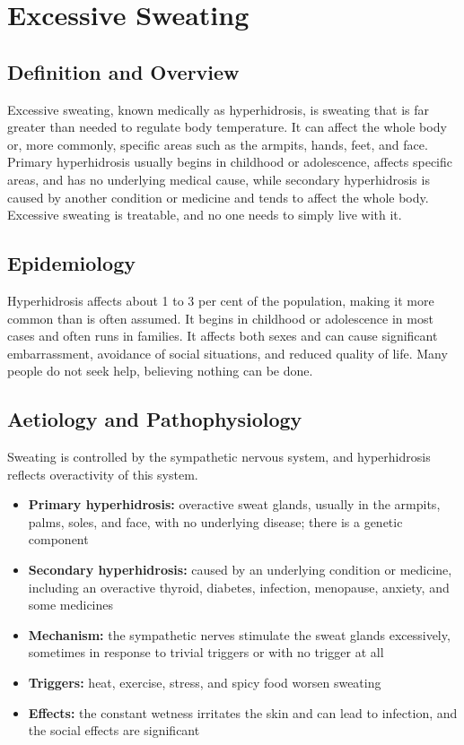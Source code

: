 \chapter{Excessive Sweating}

\section*{Definition and Overview}
Excessive sweating, known medically as hyperhidrosis, is sweating that is far greater than needed to regulate body temperature. It can affect the whole body or, more commonly, specific areas such as the armpits, hands, feet, and face. Primary hyperhidrosis usually begins in childhood or adolescence, affects specific areas, and has no underlying medical cause, while secondary hyperhidrosis is caused by another condition or medicine and tends to affect the whole body. Excessive sweating is treatable, and no one needs to simply live with it.

\section*{Epidemiology}
Hyperhidrosis affects about 1 to 3 per cent of the population, making it more common than is often assumed. It begins in childhood or adolescence in most cases and often runs in families. It affects both sexes and can cause significant embarrassment, avoidance of social situations, and reduced quality of life. Many people do not seek help, believing nothing can be done.

\section*{Aetiology and Pathophysiology}
Sweating is controlled by the sympathetic nervous system, and hyperhidrosis reflects overactivity of this system.
\begin{itemize}
    \item \textbf{Primary hyperhidrosis:} overactive sweat glands, usually in the armpits, palms, soles, and face, with no underlying disease; there is a genetic component
    \item \textbf{Secondary hyperhidrosis:} caused by an underlying condition or medicine, including an overactive thyroid, diabetes, infection, menopause, anxiety, and some medicines
    \item \textbf{Mechanism:} the sympathetic nerves stimulate the sweat glands excessively, sometimes in response to trivial triggers or with no trigger at all
    \item \textbf{Triggers:} heat, exercise, stress, and spicy food worsen sweating
    \item \textbf{Effects:} the constant wetness irritates the skin and can lead to infection, and the social effects are significant
\end{itemize}

